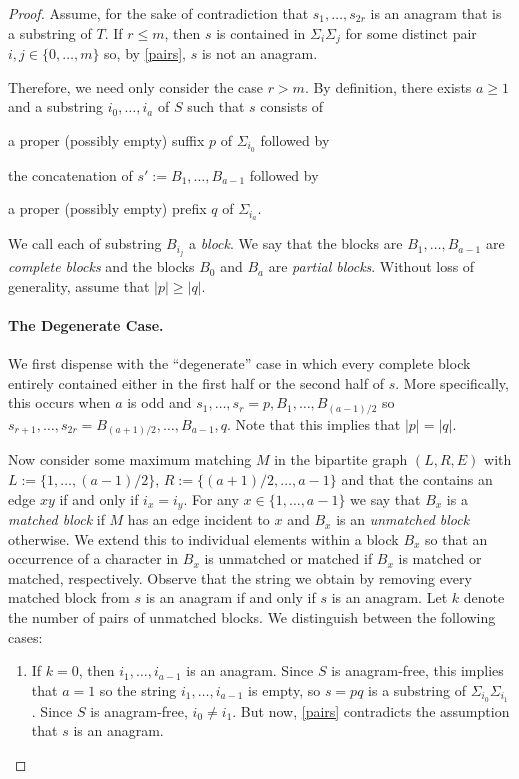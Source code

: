 \documentclass[kpfonts]{patmorin}
\begin{document}
\begin{proof}
    Assume, for the sake of contradiction that $s_1,\ldots,s_{2r}$ is an anagram that is a substring of $T$. If $r \le m$, then $s$ is contained in $\Sigma_i\Sigma_j$ for some distinct pair $i,j\in\{0,\ldots,m\}$ so, by \cref{pairs}, $s$ is not an anagram.

    Therefore, we need only consider the case $r> m$. By definition, there exists $a\ge 1$ and a substring $i_0,\ldots,i_a$ of $S$ such that $s$ consists of
    \begin{inparaenum}[(i)]
        \item a proper (possibly empty) suffix $p$ of $\Sigma_{i_0}$ followed by
        \item the concatenation of $s':=B_1,\ldots,B_{a-1}$ followed by
        \item a proper (possibly empty) prefix $q$ of $\Sigma_{i_a}$.
    \end{inparaenum}
    We call each of substring $B_{i_j}$ a \emph{block}.  We say that the blocks are $B_1,\ldots,B_{a-1}$ are \emph{complete blocks} and the blocks $B_0$ and $B_a$ are \emph{partial blocks}.  Without loss of generality, assume that $|p|\ge |q|$.

    \paragraph{The Degenerate Case.}
    We first dispense with the ``degenerate'' case in which every complete block entirely contained either in the first half or the second half of $s$.  More specifically, this occurs when $a$ is odd and $s_1,\ldots,s_r=p,B_1,\ldots,B_{(a-1)/2}$ so $s_{r+1},\ldots,s_{2r}=B_{(a+1)/2},\ldots,B_{a-1},q$.  Note that this implies that $|p|=|q|$.

    Now consider some maximum matching $M$ in the bipartite graph $(L,R,E)$ with $L:=\{1,\ldots,(a-1)/2\}$, $R:=\{(a+1)/2,\ldots,a-1\}$ and that the contains an edge $xy$ if and only if $i_x=i_y$.  For any $x\in\{1,\ldots,a-1\}$ we say that $B_x$ is a \emph{matched block} if $M$ has an edge incident to $x$ and $B_x$ is an \emph{unmatched block} otherwise. We extend this to individual elements within a block $B_x$ so that an occurrence of a character in $B_x$ is unmatched or matched if $B_x$ is matched or matched, respectively.  Observe that the string we obtain by removing every matched block from $s$ is an anagram if and only if $s$ is an anagram.  Let $k$ denote the number of pairs of unmatched blocks.  We distinguish between the following cases:
    \begin{enumerate}
        \item If $k=0$, then $i_1,\ldots,i_{a-1}$ is an anagram.  Since $S$ is anagram-free, this implies that $a=1$ so the string $i_1,\ldots,i_{a-1}$ is empty, so $s=pq$ is a substring of $\Sigma_{i_0}\Sigma_{i_1}$.  Since $S$ is anagram-free, $i_0\neq i_1$. But now, \cref{pairs} contradicts the assumption that $s$ is an anagram.


\end{enumerate}
\end{proof}
\end{document}
